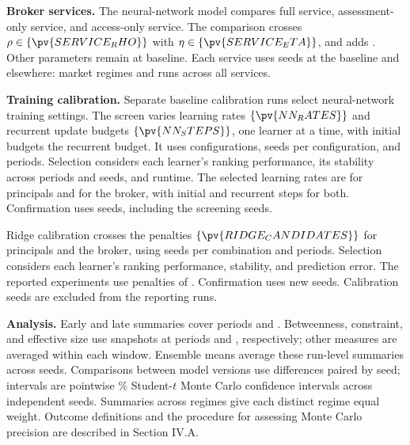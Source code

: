 \textbf{Broker services.} The neural-network model compares full service, assessment-only service, and access-only service. The comparison crosses \(\rho\in\{\pv{SERVICE_RHO}\}\) with \(\eta\in\{\pv{SERVICE_ETA}\}\), and adds . Other parameters remain at baseline. Each service uses  seeds at the baseline and  elsewhere:  market regimes and  runs across all services.

\textbf{Training calibration.} Separate baseline calibration runs select neural-network training settings. The screen varies learning rates \(\{\pv{NN_RATES}\}\) and recurrent update budgets \(\{\pv{NN_STEPS}\}\), one learner at a time, with initial budgets  the recurrent budget. It uses  configurations,  seeds per configuration, and  periods. Selection considers each learner's ranking performance, its stability across periods and seeds, and runtime. The selected learning rates are  for principals and  for the broker, with  initial and  recurrent steps for both. Confirmation uses  seeds, including the screening seeds.

Ridge calibration crosses the penalties \(\{\pv{RIDGE_CANDIDATES}\}\) for principals and the broker, using  seeds per combination and  periods. Selection considers each learner's ranking performance, stability, and prediction error. The reported experiments use penalties of . Confirmation uses  new seeds. Calibration seeds are excluded from the reporting runs.

\textbf{Analysis.} Early and late summaries cover periods  and . Betweenness, constraint, and effective size use snapshots at periods  and , respectively; other measures are averaged within each window. Ensemble means average these run-level summaries across seeds. Comparisons between model versions use differences paired by seed; intervals are pointwise \% Student-\(t\) Monte Carlo confidence intervals across independent seeds. Summaries across regimes give each distinct regime equal weight. Outcome definitions and the procedure for assessing Monte Carlo precision are described in Section IV.A.
